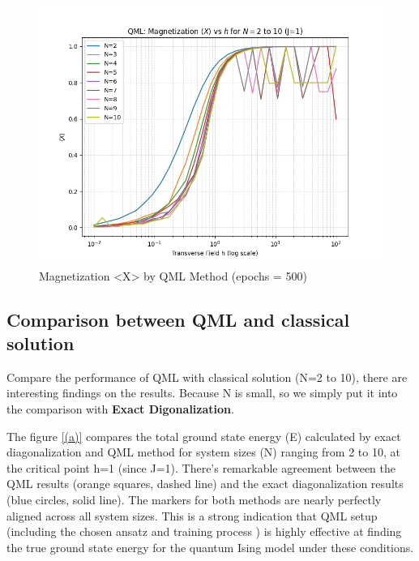 \documentclass[a4paper]{article}
\begin{document}
\begin{figure}[H]
    \centering
    \includegraphics[width=0.5\linewidth]{images/magnetization_vs_h_multiprocess.png}
    \caption{Magnetization <X> by QML Method (epochs = 500)}
    \label{12}
\end{figure}

\subsection{Comparison between QML and classical solution}
Compare the performance of QML with classical solution (N=2 to 10), there are interesting findings on the results. Because N is small, so we simply put it into the comparison with \textbf{Exact Digonalization}.

The figure \ref{(a)} compares the total ground state energy (E) calculated by exact diagonalization and QML method for system sizes (N) ranging from 2 to 10, at the critical point h=1 (since J=1). There's remarkable agreement between the QML results (orange squares, dashed line) and the exact diagonalization results (blue circles, solid line). The markers for both methods are nearly perfectly aligned across all system sizes. This is a strong indication that QML setup (including the chosen ansatz and training process ) is highly effective at finding the true ground state energy for the quantum Ising model under these conditions. 
\end{document}
